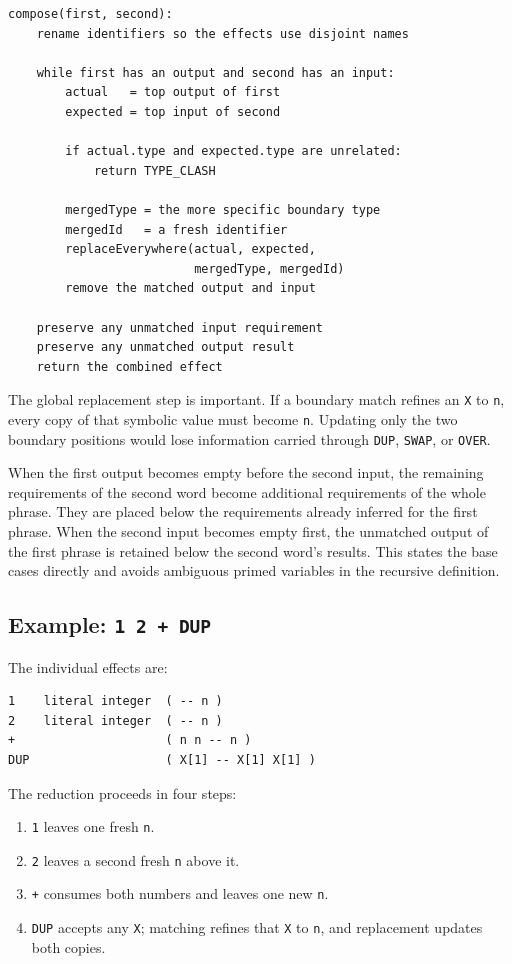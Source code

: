 \documentclass[11pt,a4paper]{article}
\begin{document}
\begin{lstlisting}
compose(first, second):
    rename identifiers so the effects use disjoint names

    while first has an output and second has an input:
        actual   = top output of first
        expected = top input of second

        if actual.type and expected.type are unrelated:
            return TYPE_CLASH

        mergedType = the more specific boundary type
        mergedId   = a fresh identifier
        replaceEverywhere(actual, expected,
                          mergedType, mergedId)
        remove the matched output and input

    preserve any unmatched input requirement
    preserve any unmatched output result
    return the combined effect
\end{lstlisting}

The global replacement step is important.  If a boundary match refines an
\texttt{X} to \texttt{n}, every copy of that symbolic value must become
\texttt{n}.  Updating only the two boundary positions would lose information
carried through \texttt{DUP}, \texttt{SWAP}, or \texttt{OVER}.

When the first output becomes empty before the second input, the remaining
requirements of the second word become additional requirements of the whole
phrase.  They are placed below the requirements already inferred for the first
phrase.  When the second input becomes empty first, the unmatched output of
the first phrase is retained below the second word's results.  This states the
base cases directly and avoids ambiguous primed variables in the recursive
definition.

\subsection{Example: \texttt{1 2 + DUP}}

The individual effects are:

\begin{lstlisting}
1    literal integer  ( -- n )
2    literal integer  ( -- n )
+                     ( n n -- n )
DUP                   ( X[1] -- X[1] X[1] )
\end{lstlisting}

The reduction proceeds in four steps:

\begin{enumerate}
  \item \texttt{1} leaves one fresh \texttt{n}.
  \item \texttt{2} leaves a second fresh \texttt{n} above it.
  \item \texttt{+} consumes both numbers and leaves one new \texttt{n}.
  \item \texttt{DUP} accepts any \texttt{X}; matching refines that \texttt{X}
        to \texttt{n}, and replacement updates both copies.
\end{enumerate}
\end{document}
